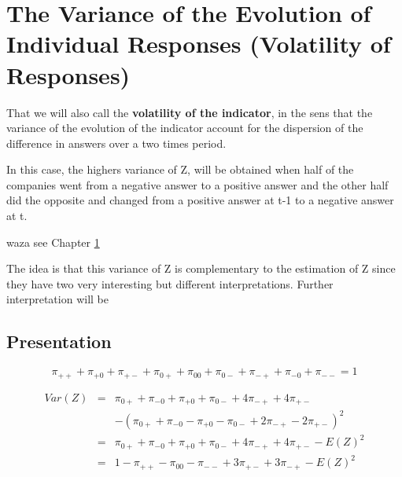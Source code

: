 \documentclass[12pt,a4paper,oneside]{book}
\begin{document}
\chapter{The Variance of the Evolution of Individual Responses (Volatility of Responses)} \label{Chapter:Z}

That we will also call the \textbf{volatility of the indicator}, in the sens that the variance of the evolution of the indicator account for the dispersion of the difference in answers over a two times period.

In this case, the highers variance of Z, will be obtained when half of the companies went from a negative answer to a positive answer and the other half did the opposite and changed from a positive answer at t-1 to a negative answer at t. 

waza see Chapter \ref{Chapter:Z}

The idea is that this variance of Z is complementary to the estimation of Z since they have two very interesting but different interpretations.
Further interpretation will be 

\section{Presentation}



\begin{equation}
\pi_{++} + \pi_{+0} + \pi_{+-} + \pi_{0+} + \pi_{00} + \pi_{0-} + \pi_{-+} + \pi_{-0} + \pi_{--} = 1 
\end{equation}

\begin{eqnarray}
Var(Z) &=& \pi_{0+} + \pi_{-0} + \pi_{+0} + \pi_{0-} +4\pi_{-+} +4\pi_{+-} \nonumber \nonumber \\ 
&&	- (\pi_{0+} + \pi_{-0} - \pi_{+0} - \pi_{0-} +2\pi_{-+} -2\pi_{+-})^2 \nonumber \\
&=& \pi_{0+} + \pi_{-0} + \pi_{+0} + \pi_{0-} +4\pi_{-+} +4\pi_{+-} - E(Z)^2 \nonumber \\
&=& 1 - \pi_{++} - \pi_{00} - \pi_{--} + 3\pi_{+-} + 3\pi_{-+} - E(Z)^2
\end{eqnarray}
\end{document}
